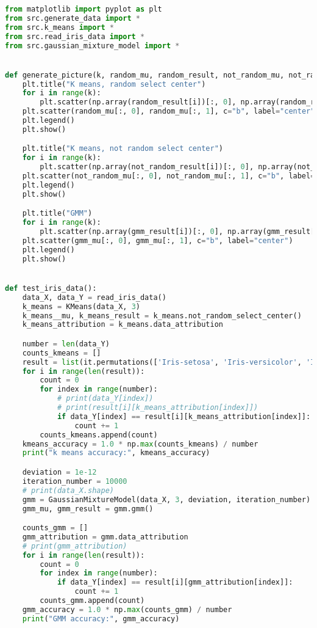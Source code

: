 \documentclass{hitreport}
\begin{document}
\begin{appendices}
\begin{lstlisting}[language=python]
from matplotlib import pyplot as plt
from src.generate_data import *
from src.k_means import *
from src.read_iris_data import *
from src.gaussian_mixture_model import *


def generate_picture(k, random_mu, random_result, not_random_mu, not_random_result, gmm_mu, gmm_result):
    plt.title("K means, random select center")
    for i in range(k):
        plt.scatter(np.array(random_result[i])[:, 0], np.array(random_result[i])[:, 1], label=str(i + 1))
    plt.scatter(random_mu[:, 0], random_mu[:, 1], c="b", label="center")
    plt.legend()
    plt.show()

    plt.title("K means, not random select center")
    for i in range(k):
        plt.scatter(np.array(not_random_result[i])[:, 0], np.array(not_random_result[i])[:, 1], label=str(i + 1))
    plt.scatter(not_random_mu[:, 0], not_random_mu[:, 1], c="b", label="center")
    plt.legend()
    plt.show()

    plt.title("GMM")
    for i in range(k):
        plt.scatter(np.array(gmm_result[i])[:, 0], np.array(gmm_result[i])[:, 1], label=str(i + 1))
    plt.scatter(gmm_mu[:, 0], gmm_mu[:, 1], c="b", label="center")
    plt.legend()
    plt.show()


def test_iris_data():
    data_X, data_Y = read_iris_data()
    k_means = KMeans(data_X, 3)
    k_means__mu, k_means_result = k_means.not_random_select_center()
    k_means_attribution = k_means.data_attribution

    number = len(data_Y)
    counts_kmeans = []
    result = list(it.permutations(['Iris-setosa', 'Iris-versicolor', 'Iris-virginica'], 3))
    for i in range(len(result)):
        count = 0
        for index in range(number):
            # print(data_Y[index])
            # print(result[i][k_means_attribution[index]])
            if data_Y[index] == result[i][k_means_attribution[index]]:
                count += 1
        counts_kmeans.append(count)
    kmeans_accuracy = 1.0 * np.max(counts_kmeans) / number
    print("k means accuracy:", kmeans_accuracy)

    deviation = 1e-12
    iteration_number = 10000
    # print(data_X.shape)
    gmm = GaussianMixtureModel(data_X, 3, deviation, iteration_number)
    gmm_mu, gmm_result = gmm.gmm()

    counts_gmm = []
    gmm_attribution = gmm.data_attribution
    # print(gmm_attribution)
    for i in range(len(result)):
        count = 0
        for index in range(number):
            if data_Y[index] == result[i][gmm_attribution[index]]:
                count += 1
        counts_gmm.append(count)
    gmm_accuracy = 1.0 * np.max(counts_gmm) / number
    print("GMM accuracy:", gmm_accuracy)



\end{lstlisting}
\end{appendices}
\end{document}
